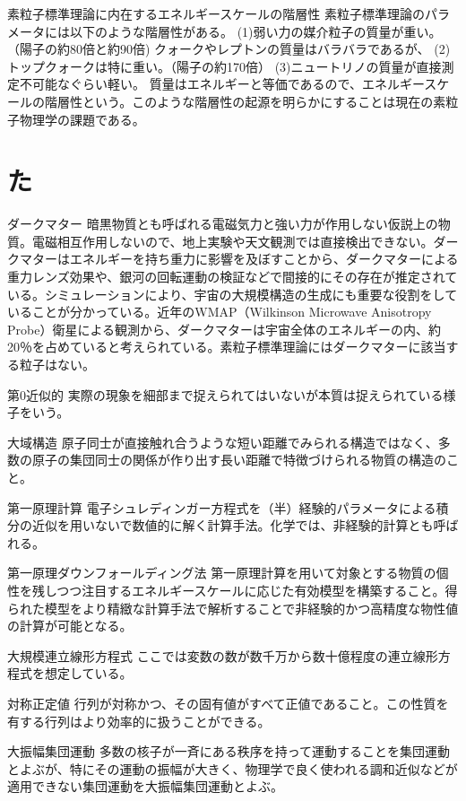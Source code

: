 \begin{用語集}
\item{素粒子標準理論に内在するエネルギースケールの階層性}{}
{素粒子標準理論のパラメータには以下のような階層性がある。 (1)弱い力の媒介粒子の質量が重い。（陽子の約80倍と約90倍) クォークやレプトンの質量はバラバラであるが、 (2)トップクォークは特に重い。（陽子の約170倍） (3)ニュートリノの質量が直接測定不可能なぐらい軽い。 質量はエネルギーと等価であるので、エネルギースケールの階層性という。このような階層性の起源を明らかにすることは現在の素粒子物理学の課題である。}
\section{た}
\item{ダークマター}{}
{暗黒物質とも呼ばれる電磁気力と強い力が作用しない仮説上の物質。電磁相互作用しないので、地上実験や天文観測では直接検出できない。ダークマターはエネルギーを持ち重力に影響を及ぼすことから、ダークマターによる重力レンズ効果や、銀河の回転運動の検証などで間接的にその存在が推定されている。シミュレーションにより、宇宙の大規模構造の生成にも重要な役割をしていることが分かっている。近年のWMAP（Wilkinson Microwave Anisotropy Probe）衛星による観測から、ダークマターは宇宙全体のエネルギーの内、約20％を占めていると考えられている。素粒子標準理論にはダークマターに該当する粒子はない。}
\item{第0近似的}{}
{実際の現象を細部まで捉えられてはいないが本質は捉えられている様子をいう。}
\item{大域構造}{}
{原子同士が直接触れ合うような短い距離でみられる構造ではなく、多数の原子の集団同士の関係が作り出す長い距離で特徴づけられる物質の構造のこと。}
\item{第一原理計算}{}
{電子シュレディンガー方程式を（半）経験的パラメータによる積分の近似を用いないで数値的に解く計算手法。化学では、非経験的計算とも呼ばれる。}
\item{第一原理ダウンフォールディング法}{}
{第一原理計算を用いて対象とする物質の個性を残しつつ注目するエネルギースケールに応じた有効模型を構築すること。得られた模型をより精緻な計算手法で解析することで非経験的かつ高精度な物性値の計算が可能となる。}
\item{大規模連立線形方程式}{}
{ここでは変数の数が数千万から数十億程度の連立線形方程式を想定している。}
\item{対称正定値}{}
{行列が対称かつ、その固有値がすべて正値であること。この性質を有する行列はより効率的に扱うことができる。}
\item{大振幅集団運動}{}
{多数の核子が一斉にある秩序を持って運動することを集団運動とよぶが、特にその運動の振幅が大きく、物理学で良く使われる調和近似などが適用できない集団運動を大振幅集団運動とよぶ。}

\end{用語集}

